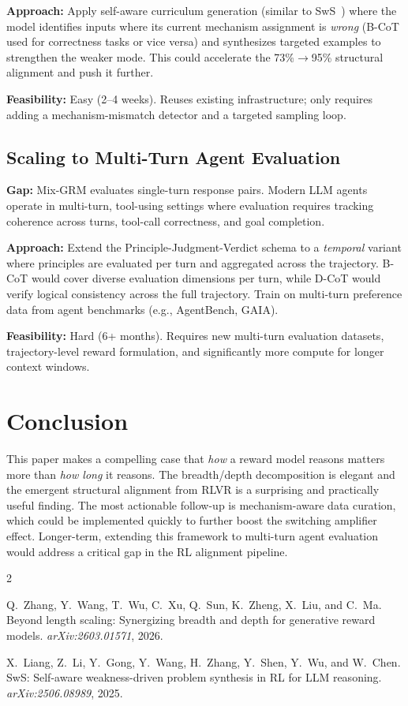 \documentclass[11pt]{article}
\begin{document}
\textbf{Approach:} Apply self-aware curriculum generation (similar to SwS~\citep{liang2025sws}) where the model identifies inputs where its current mechanism assignment is \emph{wrong} (B-CoT used for correctness tasks or vice versa) and synthesizes targeted examples to strengthen the weaker mode. This could accelerate the 73\%$\to$95\% structural alignment and push it further.

\textbf{Feasibility:} Easy (2--4 weeks). Reuses existing infrastructure; only requires adding a mechanism-mismatch detector and a targeted sampling loop.

\subsection{Scaling to Multi-Turn Agent Evaluation}

\textbf{Gap:} Mix-GRM evaluates single-turn response pairs. Modern LLM agents operate in multi-turn, tool-using settings where evaluation requires tracking coherence across turns, tool-call correctness, and goal completion.

\textbf{Approach:} Extend the Principle-Judgment-Verdict schema to a \emph{temporal} variant where principles are evaluated per turn and aggregated across the trajectory. B-CoT would cover diverse evaluation dimensions per turn, while D-CoT would verify logical consistency across the full trajectory. Train on multi-turn preference data from agent benchmarks (e.g., AgentBench, GAIA).

\textbf{Feasibility:} Hard (6+ months). Requires new multi-turn evaluation datasets, trajectory-level reward formulation, and significantly more compute for longer context windows.

\section{Conclusion}

This paper makes a compelling case that \emph{how} a reward model reasons matters more than \emph{how long} it reasons. The breadth/depth decomposition is elegant and the emergent structural alignment from RLVR is a surprising and practically useful finding. The most actionable follow-up is mechanism-aware data curation, which could be implemented quickly to further boost the switching amplifier effect. Longer-term, extending this framework to multi-turn agent evaluation would address a critical gap in the RL alignment pipeline.


\begin{thebibliography}{2}

Q.~Zhang, Y.~Wang, T.~Wu, C.~Xu, Q.~Sun, K.~Zheng, X.~Liu, and C.~Ma.
\newblock Beyond length scaling: Synergizing breadth and depth for generative reward models.
\newblock \emph{arXiv:2603.01571}, 2026.

X.~Liang, Z.~Li, Y.~Gong, Y.~Wang, H.~Zhang, Y.~Shen, Y.~Wu, and W.~Chen.
\newblock SwS: Self-aware weakness-driven problem synthesis in RL for LLM reasoning.
\newblock \emph{arXiv:2506.08989}, 2025.

\end{thebibliography}
\end{document}
